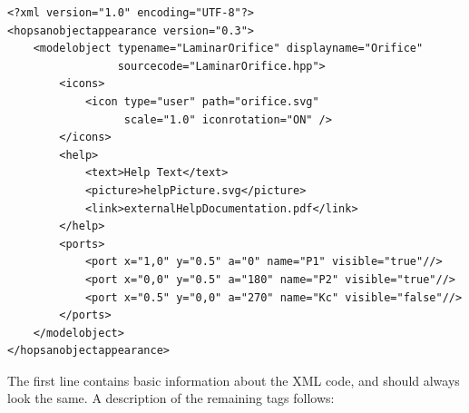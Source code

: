 \documentclass[a4paper,pdftex]{article}
\begin{document}
\begin{minipage}{\linewidth}
\begin{lstlisting}[basicstyle=\small\ttfamily]
<?xml version="1.0" encoding="UTF-8"?>
<hopsanobjectappearance version="0.3">
    <modelobject typename="LaminarOrifice" displayname="Orifice" 
                 sourcecode="LaminarOrifice.hpp">
        <icons>
            <icon type="user" path="orifice.svg" 
                  scale="1.0" iconrotation="ON" />
        </icons>
        <help>
            <text>Help Text</text>
            <picture>helpPicture.svg</picture>
            <link>externalHelpDocumentation.pdf</link>
        </help>
        <ports>
            <port x="1,0" y="0.5" a="0" name="P1" visible="true"//>
            <port x="0,0" y="0.5" a="180" name="P2" visible="true"//>
            <port x="0.5" y="0,0" a="270" name="Kc" visible="false"//>
        </ports>
    </modelobject>
</hopsanobjectappearance>
\end{lstlisting}
\end{minipage}

The first line contains basic information about the XML code, and should always look the same. 
A description of the remaining tags follows:
\end{document}
